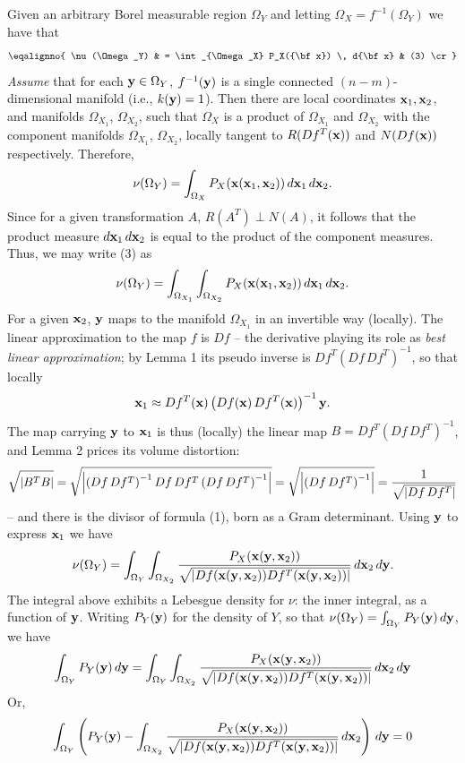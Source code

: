 Given an arbitrary Borel measurable region $\Omega_Y$ and letting
$\Omega_X = f^{-1}(\Omega_Y)$ we have that
$$
\eqalignno{
\nu(\Omega_Y) & =
\int_{\Omega_X} P_X({\bf x}) \, d{\bf x} & (3) \cr
}
$$
{\it Assume\/} that for each ${\bf y} \in \Omega_Y$, $f^{-1}({\bf y})$ is a single
connected $(n-m)$-dimensional manifold (i.e., $k({\bf y}) = 1$). Then there are local
coordinates ${\bf x}_1, {\bf x}_2$, and manifolds $\Omega_{X_1}$, $\Omega_{X_2}$, such that
$\Omega_X$ is a product of $\Omega_{X_1}$ and $\Omega_{X_2}$ with
the component manifolds $\Omega_{X_1}$, $\Omega_{X_2}$,
locally tangent to $R(Df^T({\bf x}))$ and $N(Df({\bf x}))$ respectively.
Therefore,
$$
\nu(\Omega_Y) =
\int_{\Omega_X} P_X({\bf x}({\bf x}_1, {\bf x}_2)) \,
d{\bf x}_1 \, d{\bf x}_2.
$$
Since for a given transformation $A$, $R(A^T) \perp N(A)$, it follows
that the product measure $d{\bf x}_1 \, d{\bf x}_2$ is equal to
the product of the component measures.
Thus, we may write (3) as
$$
\nu(\Omega_Y) =
\int_{\Omega_{X_1}} \int_{\Omega_{X_2}}
P_X({\bf x}({\bf x}_1, {\bf x}_2)) \, d{\bf x}_1 \, d{\bf x}_2.
$$
For a given ${\bf x}_2$, ${\bf y}$ maps to the manifold $\Omega_{X_1}$ in an
invertible way (locally). The linear approximation to the map $f$ is $Df$ --
the derivative playing its role as {\it best linear approximation\/}; by
Lemma 1 its pseudo inverse is $Df^T (Df \, Df^T)^{-1}$, so that locally
$$
{\bf x}_1 \approx Df^T({\bf x}) \left(Df({\bf x}) \, Df^T({\bf x})\right)^{-1} {\bf y}.
$$
The map carrying ${\bf y}$ to ${\bf x}_1$ is thus (locally) the linear map
$B = Df^T \left(Df \, Df^T\right)^{-1}$, and Lemma 2 prices its volume
distortion:
$$
\sqrt{|B^T B|} =
\sqrt{\left|\left(Df\,Df^T\right)^{-1} Df\, Df^T \left(Df\,Df^T\right)^{-1}\right|}
= \sqrt{\left|\left(Df \, Df^T\right)^{-1}\right|}
= {1 \over \sqrt{\left|Df\,Df^T\right|}}
$$
-- and there is the divisor of formula (1), born as a Gram determinant.
Using ${\bf y}$ to express ${\bf x}_1$ we have
$$
\nu(\Omega_Y) =
\int_{\Omega_Y} \int_{\Omega_{X_2}}
{P_X({\bf x}({\bf y}, {\bf x}_2)) \over
\sqrt{ |Df({\bf x}({\bf y}, {\bf x}_2)) Df^T({\bf x}({\bf y}, {\bf x}_2))| } }
\, d{\bf x}_2 \, d{\bf y}.
$$
The integral above exhibits a Lebesgue density for $\nu$: the inner integral,
as a function of ${\bf y}$. Writing $P_Y({\bf y})$ for the density of $Y$, so that
$\nu(\Omega_Y) = \int_{\Omega_Y} P_Y({\bf y}) \, d{\bf y}$, we have
$$
\int_{\Omega_Y} P_Y({\bf y})\, d{\bf y} =
\int_{\Omega_Y} \int_{\Omega_{X_2}} 
{P_X({\bf x}({\bf y}, {\bf x}_2)) \over 
\sqrt{ |Df({\bf x}({\bf y}, {\bf x}_2)) Df^T({\bf x}({\bf y}, {\bf x}_2))| } }
\, d{\bf x}_2 \, d{\bf y}
$$
Or,
$$
\int_{\Omega_Y} \left( P_Y({\bf y}) - 
 \int_{\Omega_{X_2}} 
{P_X({\bf x}({\bf y}, {\bf x}_2)) \over 
\sqrt{ |Df({\bf x}({\bf y}, {\bf x}_2)) Df^T({\bf x}({\bf y}, {\bf x}_2))| } }
\, d{\bf x}_2 \right) \, d{\bf y} = 0
$$


